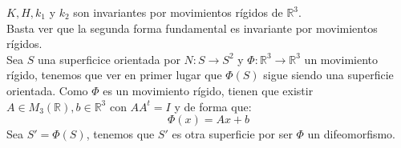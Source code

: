 \begin{ejercicio}
    $K,H,k_1$  y $k_2$ son invariantes por movimientos rígidos de $\mathbb{R}^3$.\\

    \noindent
    Basta ver que la segunda forma fundamental es invariante por movimientos rígidos.\\

    \noindent
    Sea $S$ una superficice orientada por $N:S\to S^2$ y $\Phi:\mathbb{R}^3\to\mathbb{R}^3$ un movimiento rígido, tenemos que ver en primer lugar que $\Phi(S)$ sigue siendo una superficie orientada. Como $\Phi$ es un movimiento rígido, tienen que existir $A\in M_3(\mathbb{R}),b\in \mathbb{R}^3$ con $AA^t = I$ y de forma que:
    \begin{equation*}
        \Phi(x) = Ax + b
    \end{equation*}
    Sea $S' = \Phi(S)$, tenemos que $S'$ es otra superficie por ser $\Phi$ un difeomorfismo.\\


\end{ejercicio}
